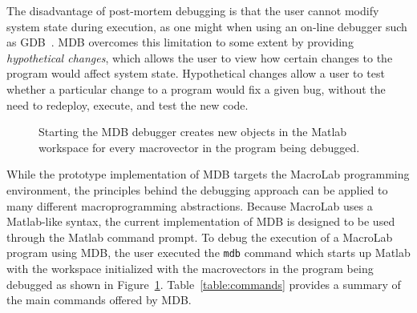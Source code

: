 The disadvantage of post-mortem debugging is that the user cannot modify system
state during execution, as one might when using an on-line debugger such as
GDB~\cite{gdb}.  MDB overcomes this limitation to some extent by providing
\emph{hypothetical changes}, which allows the user to view how certain changes to
the program would affect system state.  Hypothetical changes allow a user to
test whether a particular change to a program would fix a given bug, without the
need to redeploy, execute, and test the new code.

\begin{figure}[!htb]
\caption[MDB User Interface]{Starting the MDB debugger creates new objects in
the Matlab workspace for every macrovector in the program being debugged.}
\label{fig:matlab}
\end{figure}  

While the prototype implementation of MDB targets the MacroLab programming
environment, the principles behind the debugging approach can be applied to many
different macroprogramming abstractions. Because MacroLab uses a Matlab-like
syntax, the current implementation of MDB is designed to be used through the
Matlab command prompt. To debug the execution of a MacroLab program using MDB,
the user executed the {\tt mdb} command which starts up Matlab with the
workspace initialized with the macrovectors in the program being debugged as
shown in Figure~\ref{fig:matlab}. Table~\ref{table:commands} provides a summary
of the main commands offered by MDB\@.

